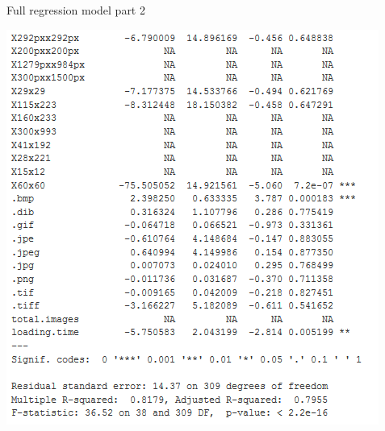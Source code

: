 \documentclass{book}
\begin{document}
\begin{table}[H]
\centering
\caption{Full regression model part 2}\label{d :r :1b}
\begin{center}
\includegraphics[scale=0.8]{../R/photos/66_FULL_PART2.PNG}  \\
\end{center}
\end{table}
\end{document}
